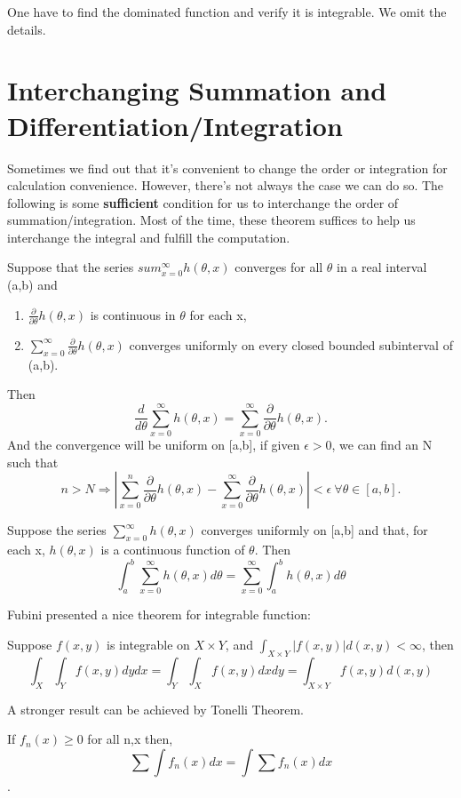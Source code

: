 \documentclass[../Transformation.tex]{subfiles}
\begin{document}
\begin{remark}
One have to find the dominated function and verify it is integrable. We omit the details.
\end{remark}

\section{Interchanging Summation and Differentiation/Integration}
Sometimes we find out that it's convenient to change the order or integration for calculation convenience. However, there's not always the case we can do so. The following is some {\bf sufficient} condition for us to interchange the order of summation/integration. Most of the time, these theorem suffices to help us interchange the integral and fulfill the computation.

\begin{theorem}Suppose that the series $sum_{x=0}^\infty h(\theta,x)$ converges for all $\theta$ in a real interval (a,b) and
\begin{enumerate}
\item $\frac{\partial}{\partial\theta}h(\theta,x)$ is continuous in $\theta$ for each x,
\item $\sum_{x=0}^{\infty}\frac{\partial}{\partial\theta}h(\theta,x)$ converges uniformly on every closed bounded subinterval of (a,b).
\end{enumerate}
Then $$\frac{d}{d\theta}\sum_{x=0}^{\infty}h(\theta,x)=\sum_{x=0}^{\infty}\frac{\partial}{\partial\theta}h(\theta,x).$$
And the convergence will be uniform on [a,b], if given $\epsilon >0$, we can find an N such that $$n>N\Rightarrow |\sum_{x=0}^n\frac{\partial}{\partial\theta}h(\theta,x)-\sum_{x=0}^{\infty}\frac{\partial}{\partial\theta}h(\theta,x)|<\epsilon\ \forall\theta\in[a,b].$$
\end{theorem}
\begin{theorem}
Suppose the series $\sum_{x=0}^{\infty}h(\theta,x)$ converges uniformly on [a,b] and that, for each x, $h(\theta,x)$ is a continuous function of $\theta$. Then
$$\int_a^b\sum_{x=0}^\infty h(\theta,x)d\theta=\sum_{x=0}^\infty\int_a^b h(\theta,x)d\theta$$
\end{theorem}

Fubini presented a nice theorem for integrable function:
\begin{theorem}
	Suppose $f(x,y)$ is integrable on $X\times Y$, and $\int_{X\times Y}|f(x,y)|d(x,y)<\infty$, then
	$$\int_X\int_Yf(x,y)dydx = \int_Y\int_X f(x,y)dxdy=\int_{X\times Y}f(x,y)d(x,y)$$
\end{theorem}

A stronger result can be achieved by Tonelli Theorem.
\begin{theorem}
If $f_n(x)\geq 0$ for all n,x then,
$$\sum\int f_n(x)dx=\int\sum f_n(x)dx$$.
\end{theorem}
\end{document}
